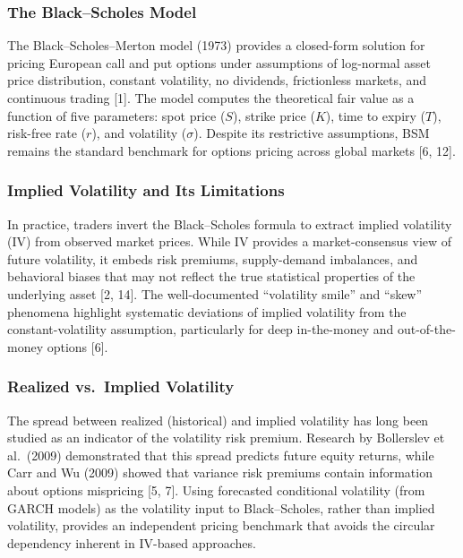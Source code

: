 \documentclass[12pt,a4paper]{article}
\begin{document}
\subsubsection{The Black--Scholes Model}

The Black--Scholes--Merton model (1973) provides a closed-form solution for pricing European call and put options under assumptions of log-normal asset price distribution, constant volatility, no dividends, frictionless markets, and continuous trading [1]. The model computes the theoretical fair value as a function of five parameters: spot price ($S$), strike price ($K$), time to expiry ($T$), risk-free rate ($r$), and volatility ($\sigma$). Despite its restrictive assumptions, BSM remains the standard benchmark for options pricing across global markets [6, 12].

\subsubsection{Implied Volatility and Its Limitations}

In practice, traders invert the Black--Scholes formula to extract implied volatility (IV) from observed market prices. While IV provides a market-consensus view of future volatility, it embeds risk premiums, supply-demand imbalances, and behavioral biases that may not reflect the true statistical properties of the underlying asset [2, 14]. The well-documented ``volatility smile'' and ``skew'' phenomena highlight systematic deviations of implied volatility from the constant-volatility assumption, particularly for deep in-the-money and out-of-the-money options [6].

\subsubsection{Realized vs.\ Implied Volatility}

The spread between realized (historical) and implied volatility has long been studied as an indicator of the volatility risk premium. Research by Bollerslev et al.\ (2009) demonstrated that this spread predicts future equity returns, while Carr and Wu (2009) showed that variance risk premiums contain information about options mispricing [5, 7]. Using forecasted conditional volatility (from GARCH models) as the volatility input to Black--Scholes, rather than implied volatility, provides an independent pricing benchmark that avoids the circular dependency inherent in IV-based approaches.
\end{document}
